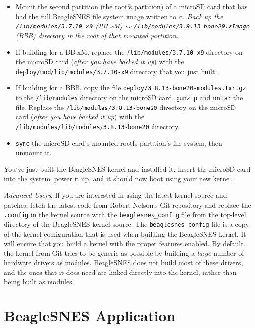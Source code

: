 \begin{itemize}
\item Mount the second partition (the rootfs partition) of a microSD card that has had the full BeagleSNES file system image written to it.  \emph{Back up the \texttt{/lib/modules/3.7.10-x9} (BB-xM) or \texttt{/lib/modules/3.8.13-bone20.zImage} (BBB) directory in the root of that mounted partition.} 
\item If building for a BB-xM, replace the \texttt{/lib/modules/3.7.10-x9} directory on the microSD card (\emph{after you have backed it up}) with the \texttt{deploy/mod/lib/modules/3.7.10-x9} directory that you just built.
\item If building for a BBB, copy the file \texttt{deploy/3.8.13-bone20-modules.tar.gz} to the \texttt{/lib/modules} directory on the microSD card. \texttt{gunzip} and un\texttt{tar} the file.  Replace the \texttt{/lib/modules/3.8.13-bone20} directory on the microSD card (\emph{after you have backed it up}) with the \texttt{/lib/modules/lib/modules/3.8.13-bone20} directory.
\item \texttt{sync} the microSD card's mounted rootfs partition's file system, then unmount it. 
\end{itemize}

\noindent{}You've just built the BeagleSNES kernel and installed it.  Insert the microSD card into the system, power it up, and it should now boot using your new kernel.

\emph{Advanced Users:} If you are interested in using the latest kernel source and patches, fetch the latest code from Robert Nelson's Git repository and replace the \texttt{.config} in the kernel source with the \texttt{beaglesnes\_config} file from the top-level directory of the BeagleSNES kernel source.  The \texttt{beaglesnes\_config} file is a copy of the kernel configuration that is used when building the BeagleSNES kernel.  It will ensure that you build a kernel with the proper features enabled.  By default, the kernel from Git tries to be generic as possible by building a \emph{large} number of hardware drivers as modules.  BeagleSNES does not build most of these drivers, and the ones that it does need are linked directly into the kernel, rather than being built as modules.

\section{BeagleSNES Application}

